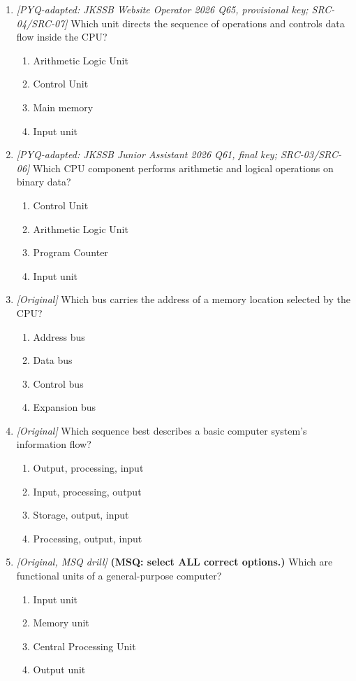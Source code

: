 \begin{enumerate}[label=\textbf{Q\arabic*.}, leftmargin=*]
\begin{enumerate}[label=\Alph*.]
    \item Memory holds data and instructions for processing.
  \end{enumerate}
\item \textit{[PYQ-adapted: JKSSB Website Operator 2026 Q65, provisional key; SRC-04/SRC-07]} Which unit directs the sequence of operations and controls data flow inside the CPU?
  \begin{enumerate}[label=\Alph*.]
\item Arithmetic Logic Unit
   \item Control Unit
   \item Main memory
   \item Input unit
  \end{enumerate}

\item \textit{[PYQ-adapted: JKSSB Junior Assistant 2026 Q61, final key; SRC-03/SRC-06]} Which CPU component performs arithmetic and logical operations on binary data?
  \begin{enumerate}[label=\Alph*.]
\item Control Unit
   \item Arithmetic Logic Unit
   \item Program Counter
   \item Input unit
  \end{enumerate}

\item \textit{[Original]} Which bus carries the address of a memory location selected by the CPU?
  \begin{enumerate}[label=\Alph*.]
\item Address bus
   \item Data bus
   \item Control bus
   \item Expansion bus
  \end{enumerate}

\item \textit{[Original]} Which sequence best describes a basic computer system's information flow?
  \begin{enumerate}[label=\Alph*.]
\item Output, processing, input
   \item Input, processing, output
   \item Storage, output, input
   \item Processing, output, input
  \end{enumerate}

\item \textit{[Original, MSQ drill]} \textbf{(MSQ: select ALL correct options.)} Which are functional units of a general-purpose computer?
  \begin{enumerate}[label=\Alph*.]
\item Input unit
   \item Memory unit
   \item Central Processing Unit
   \item Output unit
  \end{enumerate}

\end{enumerate}
